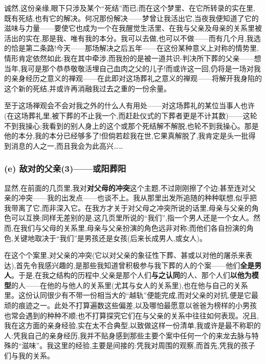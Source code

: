 诚然,这份亲缘,眼下只涉及某个“死结”而已;而在这个梦里、在它所转录的实在里,既有死结,也有它的解决。何况那份解决——梦曾让我活出它,当夜我便知道了它的滋味与力量——要使它也成为一个在我醒觉生活里、在我与父亲及母亲的关系里被活出的实在,那是我、唯有我的本分。我可以去做,也可以不做——而有几个月,我选的恰是第二条路!今天——那场解决之后五年——在这份某种意义上对称的情势里,情形肯定依然如此:我在其中牵涉,而我扮的是被一道共识-判决所下葬的父亲——想当年,我可是那个恭恭敬敬活埋自己血肉之父的儿子\dmark{}!而或许这一回,仍将是一场对我的亲身经历之意义的禅观——在此即对这场葬礼之意义的禅观——将解开我身陷的这个新的死结,并或许再消融我过去之重的一份余量。

至于这场禅观会不会对我之外的什么人有用处——对这场葬礼的某位当事人也许(在这场葬礼里,被下葬的不止我一个,而赶赴仪式的下葬者更是不计其数)——这轮不到我操心;我看到的别人身上的这个或那个死结解不解脱,也轮不到我操心。那是他的本分,我的本分已经够多了!但倘若趁我在世,它果真解脱了,我肯定是头一批得到消息的人之一,而且我会为此高兴……

\subsubsection*{(e) 敌对的父亲(3)——或阳葬阳}
\label{ch18:local:h39}

\label{ch18:local:n35}

显然,在前面的几页里,我对\textbf{对父母的冲突}这个主题,不过刚刚擦了个边;甚至连对父亲的冲突——我的出发点——也谈不上。我从那里出发所追随的种种联想,似乎把我带离了它,而非深入它。在我方才关于对父母之冲突所说的话里,母亲与父亲的角色可以互换;同样无差别的是,这几页里所说的“我们”,指一个男人还是一个女人。然而,在我们与父母的关系里,母亲与父亲扮演的角色远非对称;而他们各自扮演的角色,关键地取决于“我们”是男孩还是女孩(后来长成男人,或女人)。

在这个个案里,对父亲的冲突(它以对父亲的象征性下葬、甚或以对他的屠杀来表达),首先令我感兴趣的,是那些我知道曾积极参与我下葬的人的个案——他们\textbf{全是男人}。于是,在我之结构的历程中,父亲是那个人们\textbf{与之认同}的人、那个人们\textbf{以他为模型}的人——在他的与他人的关系里(尤其与女人的关系里),也在他与自己的关系里。这份认同\dmark{}很少有不带一份相当大的“越轨”便能完成,而对父亲的对抗,便是它最顽的痕迹之一。此处不打算遍数这些偏差,以及哪怕最愿意以爸爸为榜样的小男孩也常会遇到的种种不顺;也不打算探究它们在与父亲的关系中往往如何表现。况且,我在这方面的亲身经验,实在太不合典型,以致做这样一份清单,我或许是最不称职的人:凭我自己的亲身经历,我并不贴身感到那些主要个案中任何一个的来龙去脉与特殊的“滋味”。我这里的经验,主要是间接的:凭我对周围的观察,而首先,凭我的孩子们与我的关系。

